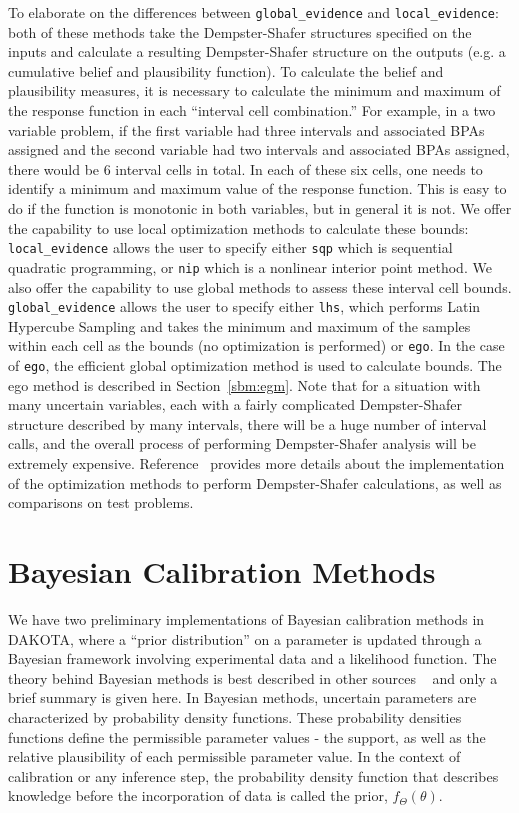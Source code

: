 To elaborate on the differences between \texttt{global\_evidence}
and \texttt{local\_evidence}: both of these methods
take the Dempster-Shafer structures specified on the inputs 
and calculate a resulting Dempster-Shafer structure on the 
outputs (e.g. a cumulative belief and plausibility function). 
To calculate the belief and plausibility measures, it is 
necessary to calculate the minimum and maximum of the response function 
in each ``interval cell combination.''  For example, in a two variable 
problem, if the first variable had three intervals and associated BPAs 
assigned and the second variable had two intervals and associated 
BPAs assigned, there would be 6 interval cells in total. 
In each of these six cells, one needs to identify a minimum and 
maximum value of the response function.  This is easy to do if 
the function is monotonic in both variables, but in general 
it is not.  We offer the capability to use local optimization 
methods to calculate these bounds: \texttt{local\_evidence}
allows the user to specify either \texttt{sqp} which is sequential 
quadratic programming, or \texttt{nip} which is a nonlinear interior point 
method.  We also offer the capability to use global methods to 
assess these interval cell bounds. \texttt{global\_evidence}
allows the user to specify either \texttt{lhs}, which performs 
Latin Hypercube Sampling and takes the minimum and maximum of 
the samples within each cell as the bounds (no optimization is 
performed) or \texttt{ego}.  In the case of \texttt{ego}, 
the efficient global optimization method is used to calculate 
bounds.  The ego method is described in Section~\ref{sbm:egm}.
Note that for a situation with many uncertain variables, 
each with a fairly complicated Dempster-Shafer structure 
described by many intervals, there will be a huge number 
of interval calls, and the overall process of performing 
Dempster-Shafer analysis will be extremely expensive. 
Reference~\cite{Tang10b} provides more details about 
the implementation of the optimization methods to perform 
Dempster-Shafer calculations, as well as comparisons on test problems.

\section{Bayesian Calibration Methods}\label{uq:bayesian}
We have two preliminary implementations of Bayesian calibration methods 
in DAKOTA, where a ``prior distribution'' on a parameter is 
updated through a Bayesian framework involving experimental data and 
a likelihood function. 
The theory behind Bayesian methods is best described in other sources 
~\cite{Kenn01} and only a brief summary is given here. 
In Bayesian methods, uncertain parameters are characterized by probability 
density functions. These probability densities functions define the 
permissible parameter values - the support, as well as the relative
 plausibility of each permissible parameter value. In the context of 
calibration or any inference step, the probability density function 
that describes knowledge before the incorporation of data is called 
the prior, $f_\Theta\left( \theta  \right)$.
 
